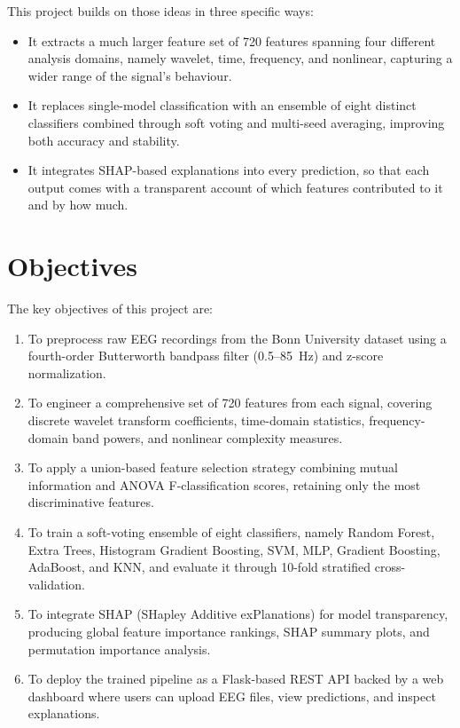 This project builds on those ideas in three specific ways:

\begin{itemize}
    \item It extracts a much larger feature set of 720 features spanning four different analysis domains, namely wavelet, time, frequency, and nonlinear, capturing a wider range of the signal's behaviour.
    \item It replaces single-model classification with an ensemble of eight distinct classifiers combined through soft voting and multi-seed averaging, improving both accuracy and stability.
    \item It integrates SHAP-based explanations into every prediction, so that each output comes with a transparent account of which features contributed to it and by how much.
\end{itemize}

\section{Objectives}

The key objectives of this project are:

\begin{enumerate}[leftmargin=2cm]
    \item To preprocess raw EEG recordings from the Bonn University dataset using a fourth-order Butterworth bandpass filter (0.5--85~Hz) and z-score normalization.
    \item To engineer a comprehensive set of 720 features from each signal, covering discrete wavelet transform coefficients, time-domain statistics, frequency-domain band powers, and nonlinear complexity measures.
    \item To apply a union-based feature selection strategy combining mutual information and ANOVA F-classification scores, retaining only the most discriminative features.
    \item To train a soft-voting ensemble of eight classifiers, namely Random Forest, Extra Trees, Histogram Gradient Boosting, SVM, MLP, Gradient Boosting, AdaBoost, and KNN, and evaluate it through 10-fold stratified cross-validation.
    \item To integrate SHAP (SHapley Additive exPlanations) for model transparency, producing global feature importance rankings, SHAP summary plots, and permutation importance analysis.
    \item To deploy the trained pipeline as a Flask-based REST API backed by a web dashboard where users can upload EEG files, view predictions, and inspect explanations.
\end{enumerate}


